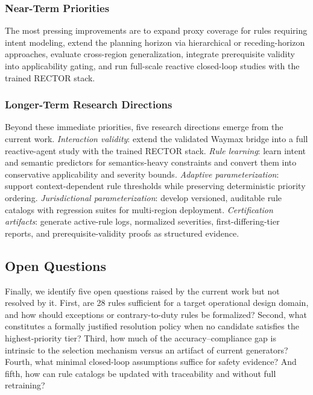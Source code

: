 \subsubsection{Near-Term Priorities}

The most pressing improvements are to expand proxy coverage for rules requiring intent modeling, extend the planning horizon via hierarchical or receding-horizon approaches, evaluate cross-region generalization, integrate prerequisite validity into applicability gating, and run full-scale reactive closed-loop studies with the trained RECTOR stack.

\subsubsection{Longer-Term Research Directions}

Beyond these immediate priorities, five research directions emerge from the current work.  \emph{Interaction validity}: extend the validated Waymax bridge into a full reactive-agent study with the trained RECTOR stack.  \emph{Rule learning}: learn intent and semantic predictors for semantics-heavy constraints and convert them into conservative applicability and severity bounds.  \emph{Adaptive parameterization}: support context-dependent rule thresholds while preserving deterministic priority ordering.  \emph{Jurisdictional parameterization}: develop versioned, auditable rule catalogs with regression suites for multi-region deployment.  \emph{Certification artifacts}: generate active-rule logs, normalized severities, first-differing-tier reports, and prerequisite-validity proofs as structured evidence.

\subsection{Open Questions}
\label{subsec:open_questions}

Finally, we identify five open questions raised by the current work but not resolved by it.  First, are 28 rules sufficient for a target operational design domain, and how should exceptions or contrary-to-duty rules be formalized?  Second, what constitutes a formally justified resolution policy when no candidate satisfies the highest-priority tier?  Third, how much of the accuracy--compliance gap is intrinsic to the selection mechanism versus an artifact of current generators?  Fourth, what minimal closed-loop assumptions suffice for safety evidence?  And fifth, how can rule catalogs be updated with traceability and without full retraining?

